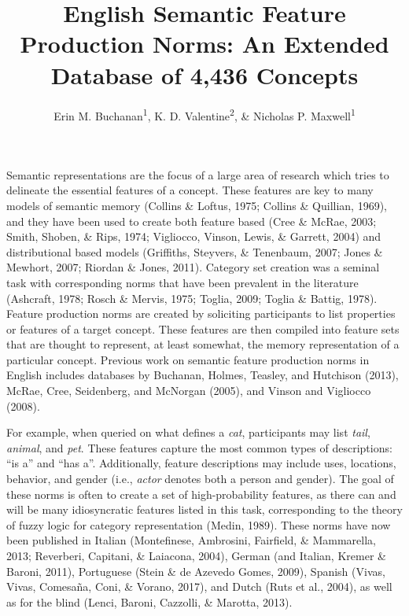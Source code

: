\documentclass[english,man]{apa6}
\title{English Semantic Feature Production Norms: An Extended Database of 4,436
Concepts}
\author{Erin M. Buchanan\textsuperscript{1}, K. D. Valentine\textsuperscript{2}, \& Nicholas P. Maxwell\textsuperscript{1}}
\affiliation{
    \vspace{0.5cm}
          \textsuperscript{1} Missouri State University\\
          \textsuperscript{2} University of Missouri  }
\theoremstyle{definition}
\theoremstyle{definition}
\theoremstyle{definition}
\theoremstyle{remark}
\begin{document}
\maketitle

\setcounter{secnumdepth}{0}



Semantic representations are the focus of a large area of research which
tries to delineate the essential features of a concept. These features
are key to many models of semantic memory (Collins \& Loftus, 1975;
Collins \& Quillian, 1969), and they have been used to create both
feature based (Cree \& McRae, 2003; Smith, Shoben, \& Rips, 1974;
Vigliocco, Vinson, Lewis, \& Garrett, 2004) and distributional based
models (Griffiths, Steyvers, \& Tenenbaum, 2007; Jones \& Mewhort, 2007;
Riordan \& Jones, 2011). Category set creation was a seminal task with
corresponding norms that have been prevalent in the literature
(Ashcraft, 1978; Rosch \& Mervis, 1975; Toglia, 2009; Toglia \& Battig,
1978). Feature production norms are created by soliciting participants
to list properties or features of a target concept. These features are
then compiled into feature sets that are thought to represent, at least
somewhat, the memory representation of a particular concept. Previous
work on semantic feature production norms in English includes databases
by Buchanan, Holmes, Teasley, and Hutchison (2013), McRae, Cree,
Seidenberg, and McNorgan (2005), and Vinson and Vigliocco (2008).

For example, when queried on what defines a \emph{cat}, participants may
list \emph{tail}, \emph{animal}, and \emph{pet}. These features capture
the most common types of descriptions: \enquote{is a} and \enquote{has
a}. Additionally, feature descriptions may include uses, locations,
behavior, and gender (i.e., \emph{actor} denotes both a person and
gender). The goal of these norms is often to create a set of
high-probability features, as there can and will be many idiosyncratic
features listed in this task, corresponding to the theory of fuzzy logic
for category representation (Medin, 1989). These norms have now been
published in Italian (Montefinese, Ambrosini, Fairfield, \& Mammarella,
2013; Reverberi, Capitani, \& Laiacona, 2004), German (and Italian,
Kremer \& Baroni, 2011), Portuguese (Stein \& de Azevedo Gomes, 2009),
Spanish (Vivas, Vivas, Comesaña, Coni, \& Vorano, 2017), and Dutch (Ruts
et al., 2004), as well as for the blind (Lenci, Baroni, Cazzolli, \&
Marotta, 2013).
\end{document}
